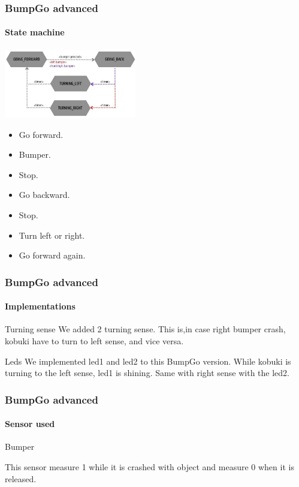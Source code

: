\documentclass{beamer}
\begin{document}
\begin{frame}
\frametitle{BumpGo advanced}
\framesubtitle{State machine}	

\centering
\includegraphics[height=3cm]{Bumpgoadvanced.jpg}

\begin{itemize}

	\item Go forward. \\ \item Bumper.\\ \item Stop.
	\item Go backward. \\ \item Stop.\\ \item Turn left or right.\\ \item Go forward again.
\end{itemize}
\end{frame}


\begin{frame}
\frametitle{BumpGo advanced}
\framesubtitle{Implementations}
\begin{block}{Turning sense}
	We added 2 turning sense. This is,in case right bumper crash, kobuki have to turn to
	left sense, and vice versa.
\end{block}
\begin{block}{Leds}
	We implemented led1 and led2 to this BumpGo version. While kobuki is turning to the left sense, led1 is shining. Same with right sense with the led2.
\end{block}
\end{frame}


\begin{frame}
\frametitle{BumpGo advanced}
\framesubtitle{Sensor used}

\begin{block}{Bumper}
	
	This sensor measure 1 while it is crashed with object and measure 0 when it is 			    released.
	
\end{block}

\end{frame}
\end{document}
